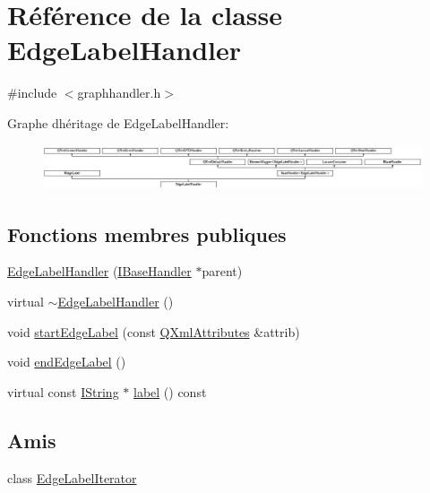 \hypertarget{class_edge_label_handler}{}\section{Référence de la classe Edge\+Label\+Handler}
\label{class_edge_label_handler}


{\ttfamily \#include $<$graphhandler.\+h$>$}

Graphe d\textquotesingle{}héritage de Edge\+Label\+Handler\+:\begin{figure}[H]
\begin{center}
\leavevmode
\includegraphics[height=1.350211cm]{class_edge_label_handler}
\end{center}
\end{figure}
\subsection*{Fonctions membres publiques}
\begin{DoxyCompactItemize}
\item 
\hyperlink{class_edge_label_handler_af3e2f45cca8bea2c749237bd04036a5d}{Edge\+Label\+Handler} (\hyperlink{class_i_base_handler}{I\+Base\+Handler} $\ast$parent)
\item 
virtual \hyperlink{class_edge_label_handler_a578dce384e969fe38a73c07d4c494760}{$\sim$\+Edge\+Label\+Handler} ()
\item 
void \hyperlink{class_edge_label_handler_a30ece7f71374fb1436ad1fb8d0dfdde4}{start\+Edge\+Label} (const \hyperlink{class_q_xml_attributes}{Q\+Xml\+Attributes} \&attrib)
\item 
void \hyperlink{class_edge_label_handler_a4e217720946ac0906a05db16909391b2}{end\+Edge\+Label} ()
\item 
virtual const \hyperlink{class_i_string}{I\+String} $\ast$ \hyperlink{class_edge_label_handler_a7a4d3d6149395ab0e368680bd4dcfb99}{label} () const 
\end{DoxyCompactItemize}
\subsection*{Amis}
\begin{DoxyCompactItemize}
\item 
class \hyperlink{class_edge_label_handler_af04914e6743dfa65bd97548d5db241fc}{Edge\+Label\+Iterator}
\end{DoxyCompactItemize}
